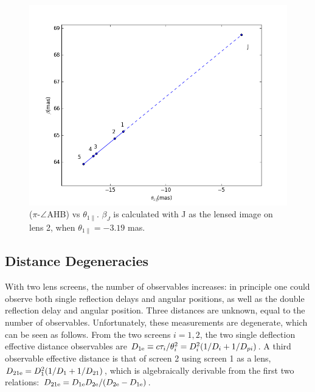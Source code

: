 \documentclass[useAMS,usenatbib]{mn2e}
\begin{document}
\begin{figure}
\centering
\includegraphics[width=1.0\linewidth]{Reflection_angle.png}
\caption{  ($\pi$-$\protect\angle$AHB) vs $\theta_{1\parallel}$.
$\beta_J$ is calculated with J as the lensed image on lens 2, when $\theta_{1\parallel}=-3.19$ mas.}
\label{vtrans}
\end{figure}

\subsection{Distance Degeneracies}
\label{sec:degeneracy}
With two lens screens, the number of observables increases: in
principle one could observe both single reflection delays and angular
positions, as well as the double reflection delay and angular
position.  Three distances are unknown, equal to the number of
observables.  Unfortunately, these measurements are degenerate, which
can be seen as follows. From the two screens $i=1,2$, the two single
deflection effective distance observables are
$D_{1{\rm e}} \equiv c\tau_i/\theta_i^2=D_i^2(1/D_i+1/D_{pi})$.  A third
observable effective distance is that of screen 2 using screen 1 as a
lens, $D_{21{\rm e}}=D_1^2(1/D_1+1/D_{21})$, which is algebraically
derivable from the first two relations:
$D_{{21}{\rm e}}=D_{1{\rm e}}D_{2{\rm e}}/(D_{2{\rm e}}-D_{1{\rm e}})$.  

\end{document}
